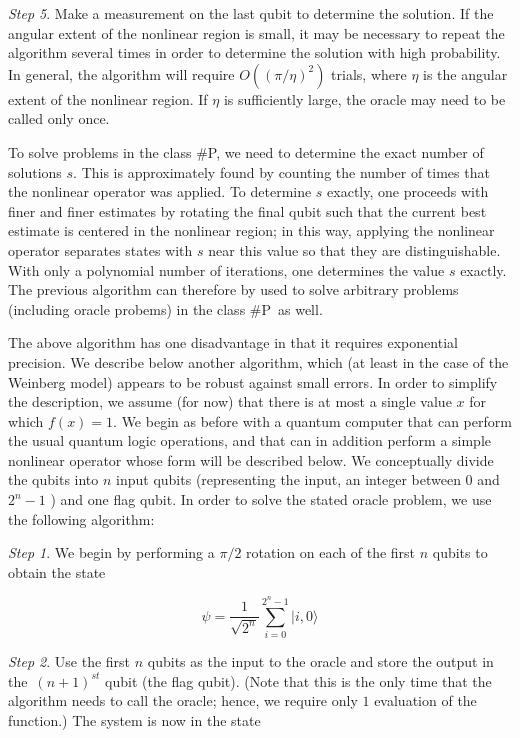 \documentclass[12pt]{article}
\begin{document}
\medskip\noindent
{\it Step 5}. Make a measurement on the last qubit to determine the solution. If the
angular extent of the nonlinear region is small, it may be necessary to repeat
the algorithm several times in order to determine the solution with high
probability. In general, the algorithm will require $O((\pi/\eta)^{2})$
trials, where $\eta$ is the angular extent of the nonlinear region. If $\eta$
is sufficiently large, the oracle may need to be called only once.

\medskip

To solve problems in the class \#P, we need to determine the exact number of
solutions $s$. This is approximately found by counting the number of times that
the nonlinear operator was applied. To determine $s$ exactly, one proceeds with
finer and finer estimates by rotating the final qubit such that the current
best estimate is centered in the nonlinear region; in this way, applying the
nonlinear operator separates states with $s$ near this value so that they are
distinguishable. With only a polynomial number of iterations, one determines
the value $s$ exactly. The previous algorithm can therefore by used to solve
arbitrary problems (including oracle probems) in the class \#P\ as well.

The above algorithm has one disadvantage in that it requires exponential
precision.  We describe below another algorithm, which (at least in the case
of the Weinberg model) appears to be robust against small errors. In order to
simplify the description, we assume (for now) that there is at most a single
value $x$ for which $f(x) = 1$. We begin as before with a quantum computer that
can perform the usual quantum logic operations, and that can in addition
perform a simple nonlinear operator whose form will be described below. We
conceptually divide the qubits into $n$ input qubits (representing the input,
an integer between $0$ and $2^{n}-1$ ) and one flag qubit. In order to solve the
stated oracle problem, we use the following algorithm:

\medskip\noindent
{\it Step 1}. We begin by performing a $\pi/2$ rotation on each of the first $n$
qubits to obtain the state%

\begin{equation}
\psi=\frac{1}{\sqrt{2^{n}}}\sum\limits_{i=0}^{2^{n}-1}|i,0\rangle
\end{equation}

\medskip\noindent
{\it Step 2}. Use the first $n$ qubits as the input to the oracle and store the output
in the\ $(n+1)^{st}$ qubit (the flag qubit). (Note that this is the only time
that the algorithm needs to call the oracle; hence, we require only $1$
evaluation of the function.) The system is now in the state%
\end{document}
